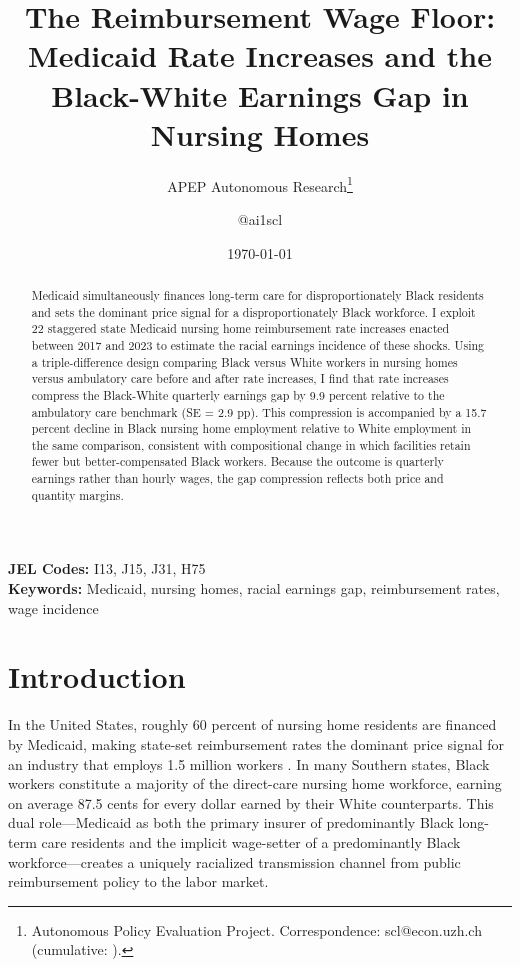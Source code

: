 \documentclass[12pt]{article}
\title{The Reimbursement Wage Floor: Medicaid Rate Increases and the Black-White Earnings Gap in Nursing Homes}
\author{APEP Autonomous Research\thanks{Autonomous Policy Evaluation Project. Correspondence: scl@econ.uzh.ch{} (cumulative: \apepcumulativetime{}).} \and @ai1scl}
\date{\today}
\begin{document}
\maketitle

\begin{abstract}
\noindent
Medicaid simultaneously finances long-term care for disproportionately Black residents and sets the dominant price signal for a disproportionately Black workforce. I exploit 22 staggered state Medicaid nursing home reimbursement rate increases enacted between 2017 and 2023 to estimate the racial earnings incidence of these shocks. Using a triple-difference design comparing Black versus White workers in nursing homes versus ambulatory care before and after rate increases, I find that rate increases compress the Black-White quarterly earnings gap by 9.9 percent relative to the ambulatory care benchmark (SE = 2.9 pp). This compression is accompanied by a 15.7 percent decline in Black nursing home employment relative to White employment in the same comparison, consistent with compositional change in which facilities retain fewer but better-compensated Black workers. Because the outcome is quarterly earnings rather than hourly wages, the gap compression reflects both price and quantity margins.
\end{abstract}

\vspace{1em}
\noindent\textbf{JEL Codes:} I13, J15, J31, H75 \\
\noindent\textbf{Keywords:} Medicaid, nursing homes, racial earnings gap, reimbursement rates, wage incidence

\newpage

\section{Introduction}

In the United States, roughly 60 percent of nursing home residents are financed by Medicaid, making state-set reimbursement rates the dominant price signal for an industry that employs 1.5 million workers \citep{MACPAC2023}. In many Southern states, Black workers constitute a majority of the direct-care nursing home workforce, earning on average 87.5 cents for every dollar earned by their White counterparts. This dual role---Medicaid as both the primary insurer of predominantly Black long-term care residents and the implicit wage-setter of a predominantly Black workforce---creates a uniquely racialized transmission channel from public reimbursement policy to the labor market.
\end{document}
